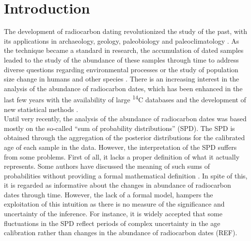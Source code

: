 \documentclass[a4paper]{article}
\begin{document}
\beginingpreprint

\linenumbers


\section*{\centering Introduction}

The development of radiocarbon dating \parencite{Libby1949} revolutionized the study of the past, with its applications in archaeology, geology, paleobiology and paleoclimatology \parencite{Taylor1995,BronkRamsey2008}. As the technique became a standard in research, the accumulation of dated samples leaded to the study of the abundance of these samples through time to address diverse questions regarding environmental processes \parencite[\emph{e.g.} changes in sea level, forest fire frequency or fluvial activity;][]{Geyh1980, Pierce2004, Thorndycraft2006} or the study of population size change in humans and other species \parencite[\emph{e.g.}][]{Rick1987,Broughton2018}.
There is an increasing interest in the analysis of the abundance of radiocarbon dates, which has been enhanced in the last few years with the availability of large \textsuperscript{14}C databases \parencite[e.g.][]{Chaput2016} and the development of new statistical methods \parencite[reviewed in][]{Crema2022}.
\\

Until very recently, the analysis of the abundance of radiocarbon dates was based mostly on the so-called ``sum of probability distributions'' (SPD). The SPD is obtained through the aggregation of the posterior distributions for the calibrated age of each sample in the data. However, the interpretation of the SPD suffers from some problems. First of all, it lacks a proper definition of what it actually represents. Some authors have discussed the meaning of such sums of probabilities without providing a formal mathematical definition \parencite[\emph{e.g.}][]{Carleton2021,Crema2022}. In spite of this, it is regarded as informative about the changes in abundance of radiocarbon dates through time. However, the lack of a formal model, hampers the exploitation of this intuition as there is no measure of the significance and uncertainty of the inference. For instance, it is widely accepted that some fluctuations in the SPD reflect periods of complex uncertainty in the age calibration rather than changes in the abundance of radiocarbon dates (REF).
\\
\end{document}
